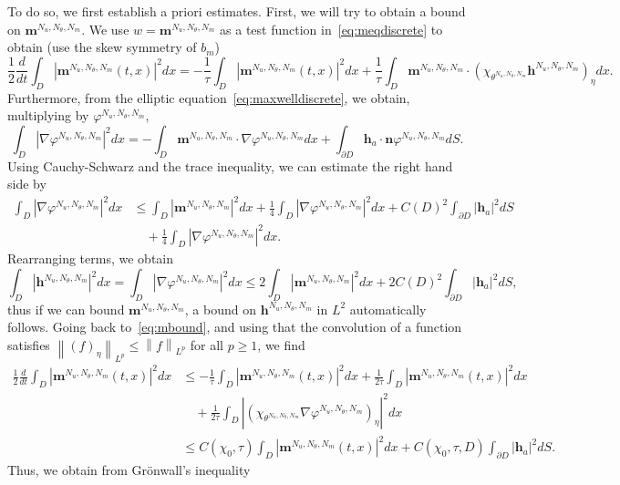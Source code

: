 \documentclass[10pt,letterpaper,twoside]{amsart}
\theoremstyle{definition}{\newtheorem{definition}[lemma]{Definition}}
\theoremstyle{note}{\newtheorem{claim}{Claim}[section]
\newtheorem*{claim*}{Claim}}
\numberwithin{equation}{section}
\newcommand{\dom}{D}
\newcommand{\norm}[1]{\left\| #1 \right\|}
\newcommand{\Grad}{\nabla}
\newcommand{\bma}{\mathbf{m}^{N_u,N_\theta,N_m}}
\newcommand{\bha}{\mathbf{h}^{N_u,N_\theta,N_m}}
\newcommand{\tha}{\theta^{N_u,N_\theta,N_m}}
\newcommand{\pha}{\varphi^{N_u,N_\theta,N_m}}
\newcommand{\bh}{\mathbf{h}}
\begin{document}
To do so, we first establish  a priori   estimates. First, we will try to obtain a bound on $\bma$. We use $w=\bma$ as a test function in~\eqref{eq:meqdiscrete} to obtain (use the skew symmetry of $b_m$)
\begin{equation}\label{eq:mbound}
	\frac12\frac{d}{dt}\int_{\dom} |\bma(t,x)|^2 dx  = -\frac{1}{\tau}\int_{\dom} |\bma(t,x)|^2 dx + \frac{1}{\tau}\int_{\dom} \bma \cdot (\chi_{\tha} \bha)_{\eta} dx. 
\end{equation}
Furthermore, from the elliptic equation~\eqref{eq:maxwelldiscrete}, we obtain, multiplying by $\pha$,
\begin{equation*}
	\int_{\dom} |\Grad \pha|^2 dx  = -\int_{\dom} \bma \cdot \Grad \pha dx +\int_{\partial\dom} \bh_a \cdot \mathbf{n}\pha dS.
\end{equation*}
Using Cauchy-Schwarz and the trace inequality, we can estimate the right hand side by
\begin{equation*}
	\begin{split}
		\int_{\dom} |\Grad \pha|^2 dx  
	&\leq \int_{\dom} |\bma|^2 dx +\frac14\int_{\dom}|\Grad \pha|^2 dx +C(\dom)^2 \int_{\partial\dom} |\bh_a|^2 dS \\
	&\quad +\frac{1}{4}\int_{\dom}|\Grad \pha|^2 dx.
		\end{split}\end{equation*}
Rearranging terms, we obtain
\begin{equation}\label{eq:boundh}
	\int_{\dom} |\bha|^2 dx =	\int_{\dom} |\Grad \pha|^2 dx \leq 2  \int_{\dom} |\bma|^2 dx  +2 C(\dom)^2 \int_{\partial\dom} |\bh_a|^2 dS ,
\end{equation}
thus if we can bound $\bma$, a bound on $\bha$ in $L^2$ automatically follows. Going back to~\eqref{eq:mbound}, and using that the convolution of a function satisfies $\norm{(f)_\eta}_{L^p}\leq \norm{f}_{L^p}$ for all $p\geq 1$, we find
\begin{equation*} 
	\begin{split}
	\frac12\frac{d}{dt}\int_{\dom} |\bma(t,x)|^2 dx & \leq  -\frac{1}{\tau}\int_{\dom} |\bma(t,x)|^2 dx + \frac{1}{2\tau}\int_{\dom} |\bma(t,x)|^2dx \\
	&\quad + \frac{1}{2\tau}\int_{\dom} |(\chi_{\tha} \Grad \pha)_{\eta}|^2 dx\\
	& \leq 
    C(\chi_0,\tau)\int_{\dom} |\bma(t,x)|^2 dx + C(\chi_0,\tau,\dom)\int_{\partial\dom} |\bh_a|^2 dS.
	\end{split}
\end{equation*}
Thus, we obtain from Gr\"onwall's inequality 
\end{document}
